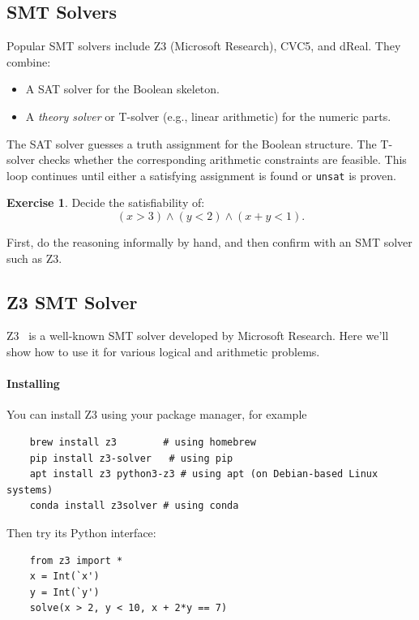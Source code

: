 \documentclass[oneside,11pt,dvipsnames]{book}
\numberwithin{equation}{section}
\theoremstyle{definition}
\newtheorem{exercise}{Exercise}[section]
\theoremstyle{remark}
\newcommand{\unsat}{\texttt{unsat}}
\begin{document}
\subsection{SMT Solvers}


Popular SMT solvers include Z3 (Microsoft Research), CVC5, and dReal.
They combine:
\begin{itemize}
  \item A SAT solver for the Boolean skeleton.
  \item A \emph{theory solver} or T-solver (e.g., linear arithmetic) for the numeric parts.
\end{itemize}

The SAT solver guesses a truth assignment for the Boolean structure. The T-solver checks whether the corresponding arithmetic constraints are feasible. This loop continues until either a satisfying assignment is found or \unsat{} is proven.

\begin{exercise}
Decide the satisfiability of:
\[
(x > 3) \land (y < 2) \land (x+y < 1).
\]

First, do the reasoning informally by hand, and then confirm with an SMT solver such as Z3.
\end{exercise}


\subsection{Z3 SMT Solver}\label{sec:z3}

Z3~\cite{de2008z3} is a well-known SMT solver developed by Microsoft Research. Here we'll show how to use it for various logical and arithmetic problems.


\paragraph{Installing} You can install Z3 using your package manager, for example

\begin{lstlisting}
    brew install z3        # using homebrew
    pip install z3-solver   # using pip
    apt install z3 python3-z3 # using apt (on Debian-based Linux systems)
    conda install z3solver # using conda
\end{lstlisting}    


Then try its Python interface:

\begin{lstlisting}
    from z3 import *
    x = Int(`x')
    y = Int(`y')
    solve(x > 2, y < 10, x + 2*y == 7)
\end{lstlisting} 
\end{document}
